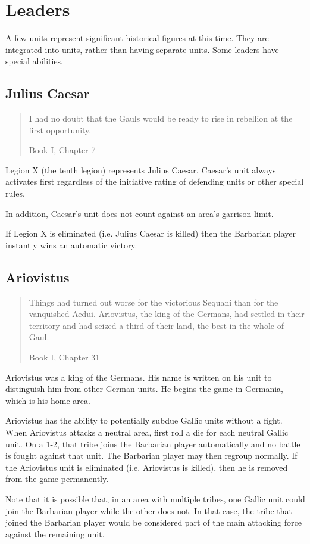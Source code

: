 \section{Leaders}
\par
A few units represent significant historical figures at this time. They are integrated into units, rather than having separate units. Some leaders have special abilities.

\subsection{Julius Caesar}
\blockquote[Book I, Chapter 7]{I had no doubt that the Gauls would be ready to rise in rebellion at the first opportunity.}
\par
Legion X (the tenth legion) represents Julius Caesar. Caesar’s unit always activates first regardless of the initiative rating of defending units or other special rules.

In addition, Caesar’s unit does not count against an area’s garrison limit.

If Legion X is eliminated (i.e. Julius Caesar is killed) then the Barbarian player instantly wins an automatic victory.

\subsection{Ariovistus}
\blockquote[Book I, Chapter 31]{Things had turned out worse for the victorious Sequani than for the vanquished Aedui. Ariovistus, the king of the Germans, had settled in their territory and had seized a third of their land, the best in the whole of Gaul.}
\par
Ariovistus was a king of the Germans. His name is written on his unit to distinguish him from other German units. He begins the game in Germania, which is his home area.

Ariovistus has the ability to potentially subdue Gallic units without a fight. When Ariovistus attacks a neutral area, first roll a die for each neutral Gallic unit. On a 1-2, that tribe joins the Barbarian player automatically and no battle is fought against that unit. The Barbarian player may then regroup normally. If the Ariovistus unit is eliminated (i.e. Ariovistus is killed), then he is removed from the game permanently.

Note that it is possible that, in an area with multiple tribes, one Gallic unit could join the Barbarian player while the other does not. In that case, the tribe that joined the Barbarian player would be considered part of the main attacking force against the remaining unit.

